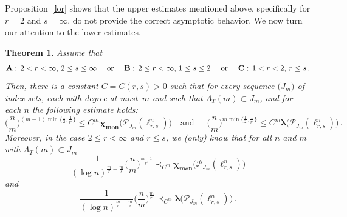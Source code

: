 \documentclass[12pt]{amsart}
\numberwithin{subsection}{section}
\newtheorem{theorem}{Theorem}[section]
\theoremstyle{definition}
\theoremstyle{remark}
\DeclareMathOperator{\mon}{mon}
\newcommand{\chimon}{\chi_{\mon}}
\begin{document}
Proposition~\ref{lor} shows that the upper estimates mentioned above, specifically for $r=2$ and $s=\infty$, do not provide
the correct asymptotic behavior.  We now turn our attention to the lower estimates.


\begin{theorem} \label{t-final2}
Assume that
\[
\text{$\mathbf{A}: \,2 < r < \infty,  \,2\leq s \leq \infty$ \quad or \quad
$\mathbf{B}: \, 2 \leq r < \infty, \, 1 \leq s \leq 2$ \quad or \quad $\mathbf{C}: \,1 < r < 2 ,\, r \leq s$\,.}
\]
Then, there  is a  constant $C=C(r,s) >0$  such that for every sequence 
$\big(J_m\big)$ of index sets, each with degree at most~$m$ and such that  $\Lambda_T(m) \subset J_m$, and for each $n$ the following estimate holds{\rm:}
\begin{equation*} 
\Big(\frac{n}{m}\Big)^{(m-1)\min\big\{\frac{1}{2},\frac{1}{r'}\big\}}
\leq C^m
\boldsymbol{\chimon}\big(\mathcal{P}_{J_m}(\ell_{r,s}^n)\big)
\,\,\,\, \text{ and } \,\,\,\,\,\,\,
\Big( \frac{n}{m}\Big)^{m\min\big\{\frac{1}{2},\frac{1}{r'}\big\}}
\leq C^m
\boldsymbol{\lambda}\big(\mathcal{P}_{J_m}(\ell_{r,s}^n)\big)\,.
\end{equation*}
Moreover, in the case $2 \leq  r < \infty$ and $r \leq  s$, we (only) know that for all $n$ and $m$ with
$\Lambda_T(m) \subset J_m$
\[
\frac{1}{(\log n)^{\frac{m}{r}-\frac{m}{s} }}\Big( \frac{n}{m} \Big)^{\frac{m-1}{r'}}
\prec_{C^m} \boldsymbol{\chimon}\big(\mathcal{P}_{J_m}(\ell_{r,s}^n)\big)
\]
and
\[
\frac{1}{(\log n)^{\frac{m}{r}-\frac{m}{s} }}\Big( \frac{n}{m} \Big)^{\frac{m}{r'}}
\prec_{C^m}
\boldsymbol{\lambda}\big(\mathcal{P}_{J_m}(\ell_{r,s}^n)\big)\,.
\]
\end{theorem}
\end{document}
